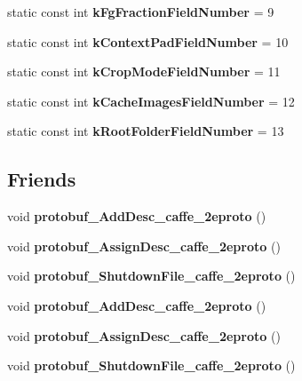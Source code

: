 \begin{DoxyCompactItemize}
static const int {\bfseries k\+Fg\+Fraction\+Field\+Number} = 9
\item 
\mbox{\label{classcaffe_1_1_window_data_parameter_ae9add435ac70da355ecd884b9e385226}} 
static const int {\bfseries k\+Context\+Pad\+Field\+Number} = 10
\item 
\mbox{\label{classcaffe_1_1_window_data_parameter_a873d45140c9501588519b53229220872}} 
static const int {\bfseries k\+Crop\+Mode\+Field\+Number} = 11
\item 
\mbox{\label{classcaffe_1_1_window_data_parameter_a13d4ad2ecd325cdf28a89318836076e3}} 
static const int {\bfseries k\+Cache\+Images\+Field\+Number} = 12
\item 
\mbox{\label{classcaffe_1_1_window_data_parameter_a0d5eeaae12a383e71f456a945cc9d866}} 
static const int {\bfseries k\+Root\+Folder\+Field\+Number} = 13
\end{DoxyCompactItemize}
\subsection*{Friends}
\begin{DoxyCompactItemize}
\item 
\mbox{\label{classcaffe_1_1_window_data_parameter_a2670a9c8ffd0e5105cf7522cd6f8613d}} 
void {\bfseries protobuf\+\_\+\+Add\+Desc\+\_\+caffe\+\_\+2eproto} ()
\item 
\mbox{\label{classcaffe_1_1_window_data_parameter_a7f145bddbdde78003d27e42c7e003d23}} 
void {\bfseries protobuf\+\_\+\+Assign\+Desc\+\_\+caffe\+\_\+2eproto} ()
\item 
\mbox{\label{classcaffe_1_1_window_data_parameter_a026784a8e4e76f1b4daf9d033d2ece83}} 
void {\bfseries protobuf\+\_\+\+Shutdown\+File\+\_\+caffe\+\_\+2eproto} ()
\item 
\mbox{\label{classcaffe_1_1_window_data_parameter_a2670a9c8ffd0e5105cf7522cd6f8613d}} 
void {\bfseries protobuf\+\_\+\+Add\+Desc\+\_\+caffe\+\_\+2eproto} ()
\item 
\mbox{\label{classcaffe_1_1_window_data_parameter_a7f145bddbdde78003d27e42c7e003d23}} 
void {\bfseries protobuf\+\_\+\+Assign\+Desc\+\_\+caffe\+\_\+2eproto} ()
\item 
\mbox{\label{classcaffe_1_1_window_data_parameter_a026784a8e4e76f1b4daf9d033d2ece83}} 
void {\bfseries protobuf\+\_\+\+Shutdown\+File\+\_\+caffe\+\_\+2eproto} ()
\end{DoxyCompactItemize}


